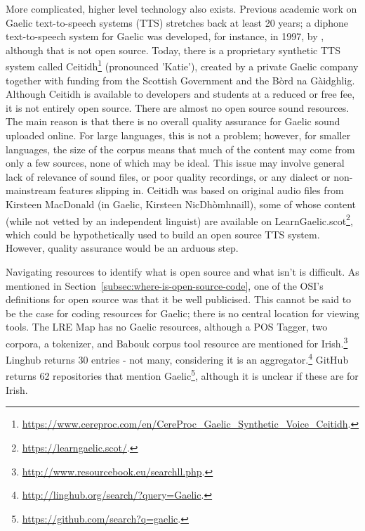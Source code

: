  More complicated, higher level technology also exists. Previous academic work on Gaelic text-to-speech systems (TTS) stretches back at least 20 years; a diphone text-to-speech system for Gaelic was developed, for instance, in 1997, by \citet{wolters1997diphone}, although that is not open source. Today, there is a proprietary synthetic TTS system called Ceitidh\footnote{\href{https://www.cereproc.com/en/CereProc_Gaelic_Synthetic_Voice_Ceitidh}{https://www.cereproc.com/en/CereProc\_Gaelic\_Synthetic\_Voice\_Ceitidh}. } (pronounced 'Katie'), created by a private Gaelic company together with funding from the Scottish Government and the B\`ord na G\`aidghlig. Although Ceitidh is available to developers and students at a reduced or free fee, it is not entirely open source. There are almost no open source sound resources. The main reason is that there is no overall quality assurance for Gaelic sound uploaded online. For large languages, this is not a problem; however, for smaller languages, the size of the corpus means that much of the content may come from only a few sources, none of which may be ideal. This issue may involve general lack of relevance of sound files, or poor quality recordings, or any dialect or non-mainstream features slipping in. Ceitidh was based on original audio files from Kirsteen MacDonald (in Gaelic, Kirsteen NicDh\`{o}mhnaill), some of whose content (while not vetted by an independent linguist) are available on LearnGaelic.scot\footnote{\href{https://learngaelic.scot/}{https://learngaelic.scot/}. }, which could be hypothetically used to build an open source TTS system. However, quality assurance would be an arduous step.

Navigating resources to identify what is open source and what isn't is difficult. As mentioned in Section~\ref{subsec:where-is-open-source-code}, one of the OSI's definitions for open source was that it be well publicised. This cannot be said to be the case for coding resources for Gaelic; there is no central location for viewing tools. The LRE Map has no Gaelic resources, although a POS Tagger, two corpora, a tokenizer, and Babouk corpus tool resource are mentioned for Irish.\footnote{\href{http://www.resourcebook.eu/searchll.php}{http://www.resourcebook.eu/searchll.php}. } Linghub returns 30 entries - not many, considering it is an aggregator.\footnote{\href{http://linghub.org/search/?query=Gaelic}{http://linghub.org/search/?query=Gaelic}. } GitHub returns 62 repositories that mention Gaelic\footnote{\href{https://github.com/search?q=gaelic}{https://github.com/search?q=gaelic}. }, although it is unclear if these are for Irish.

